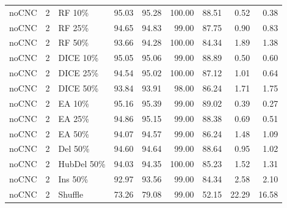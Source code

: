 {\begin{longtable}{rllrrrrrr}
noCNC & 2 & RF 10\% & 95.03 & 95.28 & 100.00 & 88.51 & 0.52 & 0.38 \\
noCNC & 2 & RF 25\% & 94.65 & 94.83 & 99.00 & 87.75 & 0.90 & 0.83 \\
noCNC & 2 & RF 50\% & 93.66 & 94.28 & 100.00 & 84.34 & 1.89 & 1.38 \\
noCNC & 2 & DICE 10\% & 95.05 & 95.06 & 99.00 & 88.89 & 0.50 & 0.60 \\
noCNC & 2 & DICE 25\% & 94.54 & 95.02 & 100.00 & 87.12 & 1.01 & 0.64 \\
noCNC & 2 & DICE 50\% & 93.84 & 93.91 & 98.00 & 86.24 & 1.71 & 1.75 \\
noCNC & 2 & EA 10\% & 95.16 & 95.39 & 99.00 & 89.02 & 0.39 & 0.27 \\
noCNC & 2 & EA 25\% & 94.86 & 95.15 & 99.00 & 88.38 & 0.69 & 0.51 \\
noCNC & 2 & EA 50\% & 94.07 & 94.57 & 99.00 & 86.24 & 1.48 & 1.09 \\
noCNC & 2 & Del 50\% & 94.60 & 94.64 & 99.00 & 88.64 & 0.95 & 1.02 \\
noCNC & 2 & HubDel 50\% & 94.03 & 94.35 & 100.00 & 85.23 & 1.52 & 1.31 \\
noCNC & 2 & Ins 50\% & 92.97 & 93.56 & 99.00 & 84.34 & 2.58 & 2.10 \\
noCNC & 2 & Shuffle & 73.26 & 79.08 & 99.00 & 52.15 & 22.29 & 16.58 \\
\end{longtable}
}

